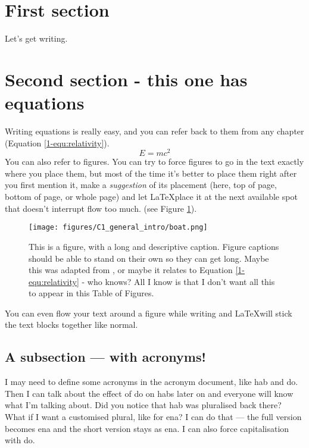 \section{First section}
Let's get writing. 

\section{Second section - this one has equations}
Writing equations is really easy, and you can refer back to them from any chapter (Equation \ref{1-equ:relativity}).
%
\begin{equation}
    \label{1-equ:relativity}
    E = mc^2
\end{equation}
%
You can also refer to figures. You can try to force figures to go in the text exactly where you place them, but most of the time it's better to place them right after you first mention it, make a \textit{suggestion} of its placement (here, top of page, bottom of page, or whole page) and let \LaTeX place it at the next available spot that doesn't interrupt flow too much. (see Figure \ref{1-fig:boats}). 
%
\begin{figure}[htbp]
    \centering
    \texttt{[image: figures/C1\_general\_intro/boat.png]}
    \caption[This is a figure with an alternative caption]{This is a figure, with a long and descriptive caption. Figure captions should be able to stand on their own so they can get long. Maybe this was adapted from \citet{alexander_navigating_2016}, or maybe it relates to Equation \ref{1-equ:relativity} - who knows? All I know is that I don't want all this to appear in this Table of Figures.} 
    \label{1-fig:boats}
\end{figure}
%
You can even flow your text around a figure while writing and \LaTeX will stick the text blocks together like normal. 

\subsection{A subsection --- with acronyms!}
I may need to define some acronyms in the acronym document, like \ac{hab} and \ac{do}. Then I can talk about the effect of \ac{do} on \acp{hab} later on and everyone will know what I'm talking about. Did you notice that \ac{hab} was pluralised back there? What if I want a customised plural, like for \ac{ena}? I can do that --- the full version becomes \ac{ena} and the short version stays as \ac{ena}. I can also force capitalisation with \Ac{do}. 

